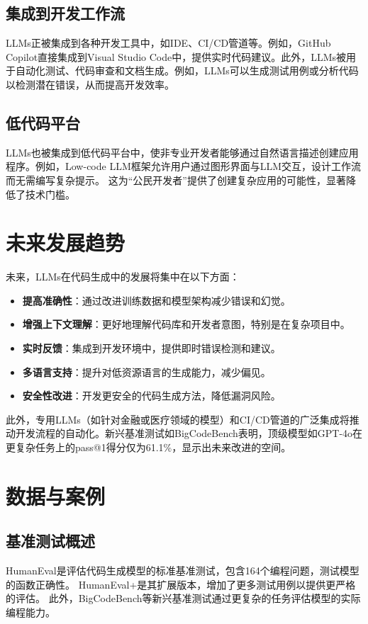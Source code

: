 \documentclass[11pt]{article}
\begin{document}
\subsection{集成到开发工作流}
LLMs正被集成到各种开发工具中，如IDE、CI/CD管道等。例如，GitHub Copilot直接集成到Visual Studio Code中，提供实时代码建议。此外，LLMs被用于自动化测试、代码审查和文档生成。例如，LLMs可以生成测试用例或分析代码以检测潜在错误，从而提高开发效率。

\subsection{低代码平台}
LLMs也被集成到低代码平台中，使非专业开发者能够通过自然语言描述创建应用程序。例如，Low-code LLM框架允许用户通过图形界面与LLM交互，设计工作流而无需编写复杂提示。%
这为“公民开发者”提供了创建复杂应用的可能性，显著降低了技术门槛。

\section{未来发展趋势}
未来，LLMs在代码生成中的发展将集中在以下方面：
\begin{itemize}
    \item \textbf{提高准确性}：通过改进训练数据和模型架构减少错误和幻觉。%
    \item \textbf{增强上下文理解}：更好地理解代码库和开发者意图，特别是在复杂项目中。
    \item \textbf{实时反馈}：集成到开发环境中，提供即时错误检测和建议。
    \item \textbf{多语言支持}：提升对低资源语言的生成能力，减少偏见。
    \item \textbf{安全性改进}：开发更安全的代码生成方法，降低漏洞风险。
\end{itemize}
此外，专用LLMs（如针对金融或医疗领域的模型）和CI/CD管道的广泛集成将推动开发流程的自动化。新兴基准测试如BigCodeBench表明，顶级模型如GPT-4o在更复杂任务上的pass@1得分仅为61.1\%，显示出未来改进的空间。%

\section{数据与案例}
\subsection{基准测试概述}
HumanEval是评估代码生成模型的标准基准测试，包含164个编程问题，测试模型的函数正确性。%
HumanEval+是其扩展版本，增加了更多测试用例以提供更严格的评估。%
此外，BigCodeBench等新兴基准测试通过更复杂的任务评估模型的实际编程能力。
\end{document}
